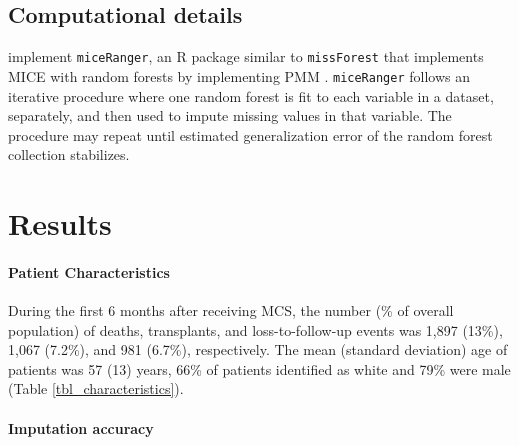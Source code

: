 \documentclass{article}
\begin{document}
\hypertarget{computational-details}{%
\subsection{Computational details}\label{computational-details}}

\label{subsec:computing}

implement \texttt{miceRanger}, an R package similar to
\texttt{missForest} that implements MICE with random forests by
implementing PMM \cite{missForest}. \texttt{miceRanger} follows an
iterative procedure where one random forest is fit to each variable in a
dataset, separately, and then used to impute missing values in that
variable. The procedure may repeat until estimated generalization error
of the random forest collection stabilizes.

\hypertarget{results}{%
\section{Results}\label{results}}

\paragraph{Patient Characteristics}

During the first 6 months after receiving MCS, the number (\% of overall
population) of deaths, transplants, and loss-to-follow-up events was
1,897 (13\%), 1,067 (7.2\%), and 981 (6.7\%), respectively. The mean
(standard deviation) age of patients was 57 (13) years, 66\% of patients
identified as white and 79\% were male (Table
\ref{tbl_characteristics}).

\paragraph{Imputation accuracy}
\end{document}
